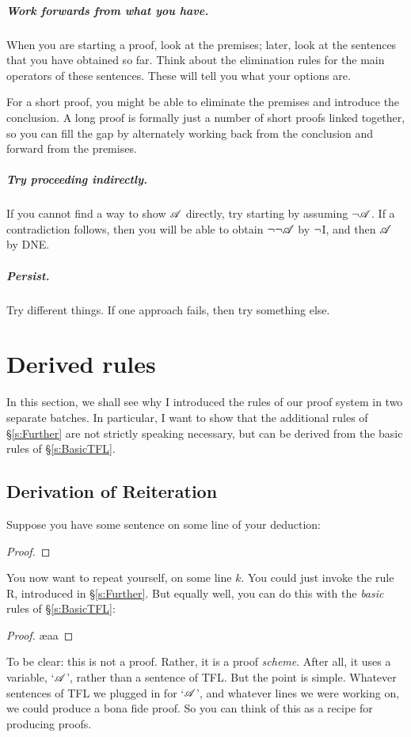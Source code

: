 \paragraph{Work forwards from what you have.}
When you are starting a proof, look at the premises; later, look at the sentences that you have obtained so far. Think about the elimination rules for the main operators of these sentences. These will tell you what your options are.

For a short proof, you might be able to eliminate the premises and introduce the conclusion. A long proof is formally just a number of short proofs linked together, so you can fill the gap by alternately working back from the conclusion and forward from the premises.

\paragraph{Try proceeding indirectly.}
If you cannot find a way to show $\mathscr{A}$ directly, try starting by assuming $\neg \mathscr{A}$. If a contradiction follows, then you will be able to obtain $\neg \neg \mathscr{A}$ by $\neg$I, and then $\mathscr{A}$ by DNE.  

\paragraph{Persist.}
Try different things. If one approach fails, then try something else.


\chapter{Derived rules}\label{s:Derived}
In this section, we shall see why I introduced the rules of our proof system in two separate batches. In particular, I want to show that the additional rules of \S\ref{s:Further} are not strictly speaking necessary, but can be derived from the basic rules of \S\ref{s:BasicTFL}.

\section{Derivation of Reiteration}
Suppose you have some sentence on some line of your deduction:
\begin{proof}
\end{proof}
You now want to repeat yourself, on some line $k$. You could just invoke the rule R, introduced in \S\ref{s:Further}. But equally well, you can do this with the \emph{basic} rules of \S\ref{s:BasicTFL}:
\begin{proof}
	\ae{aa}
\end{proof}
To be clear: this is not a proof. Rather, it is a proof  \emph{scheme}. After all, it uses a variable, `$\mathscr{A}$', rather than a sentence of TFL. But the point is simple. Whatever sentences of TFL we plugged in for `$\mathscr{A}$', and whatever lines we were working on, we could produce a bona fide proof. So you can think of this as a recipe for producing proofs. 

